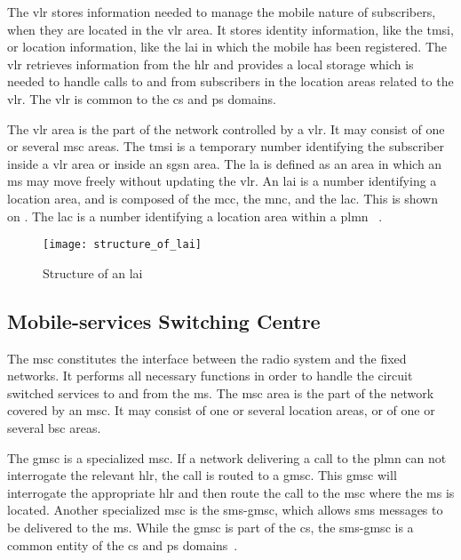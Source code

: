       The \gls{vlr} stores information needed to manage the mobile
      nature of subscribers, when they are located in the \gls{vlr}
      area. It stores identity information, like the \gls{tmsi}, or
      location information, like the \gls{lai} in which the mobile has
      been registered. The \gls{vlr} retrieves information from the
      \gls{hlr} and provides a local storage which is needed to handle
      calls to and from subscribers in the location areas related to the
      \gls{vlr}. The \gls{vlr} is common to the \gls{cs} and \gls{ps}
      domains.

      The \gls{vlr} area is the part of the network controlled by a
      \gls{vlr}. It may consist of one or several \gls{msc} areas. The
      \gls{tmsi} is a temporary number identifying the subscriber
      inside a \gls{vlr} area or inside an \gls{sgsn} area. The
      \gls{la} is defined as an area in which an \gls{ms} may move
      freely without updating the \gls{vlr}. An \gls{lai} is a number
      identifying a location area, and is composed of the \gls{mcc},
      the \gls{mnc}, and the \gls{lac}. This is shown on
      . The \gls{lac} is a number
      identifying a location area within a \gls{plmn}
      ~\cite{etsi_gsm_1992-1,etsi_gsm_2001,3gpp_ts_2003,3gpp_ts_2015}.

      \begin{figure}[h]
        \centering
        \texttt{[image: structure\_of\_lai]}
        \caption{Structure of an \gls{lai}~\cite{3gpp_ts_2003}}
        \label{fig:structure_of_lai}
      \end{figure}

      \iffalse
      GSM 03.08
      0104 def and 0302 full def
      0301. 0303 for tmsi structure
      0308
      \fi

    \subsection{Mobile-services Switching Centre}
    \label{sssection:msc}

      The \gls{msc} constitutes the interface between the radio system
      and the fixed networks. It performs all necessary functions in
      order to handle the circuit switched services to and from the
      \gls{ms}. The \gls{msc} area is the part of the network covered by
      an \gls{msc}. It may consist of one or several location areas, or
      of one or several \gls{bsc} areas.

      The \gls{gmsc} is a specialized \gls{msc}. If a network delivering
      a call to the \gls{plmn} can not interrogate the relevant
      \gls{hlr}, the call is routed to a \gls{gmsc}. This \gls{gmsc}
      will interrogate the appropriate \gls{hlr} and then route the call
      to the \gls{msc} where the \gls{ms} is located. Another
      specialized \gls{msc} is the \gls{sms-gmsc}, which allows
      \gls{sms} messages to be delivered to the \gls{ms}. While the
      \gls{gmsc} is part of the \gls{cs}, the \gls{sms-gmsc} is a common
      entity of the \gls{cs} and \gls{ps} domains~\cite{3gpp_ts_2015}. 

